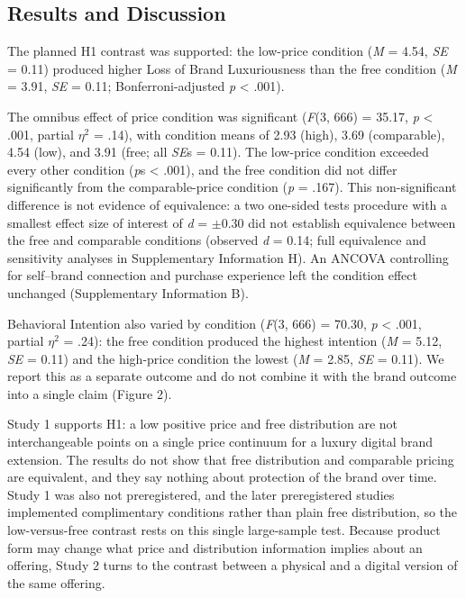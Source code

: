 \documentclass[12pt, a4paper]{article}
\begin{document}
\subsection{Results and Discussion}

The planned H1 contrast was supported: the low-price condition (\emph{M} = 4.54, \emph{SE} = 0.11) produced higher Loss of Brand Luxuriousness than the free condition (\emph{M} = 3.91, \emph{SE} = 0.11; Bonferroni-adjusted \emph{p} \textless{} .001).

The omnibus effect of price condition was significant (\emph{F}(3, 666) = 35.17, \emph{p} \textless{} .001, partial $\eta^2$ = .14), with condition means of 2.93 (high), 3.69 (comparable), 4.54 (low), and 3.91 (free; all \emph{SE}s = 0.11). The low-price condition exceeded every other condition (\emph{p}s \textless{} .001), and the free condition did not differ significantly from the comparable-price condition (\emph{p} = .167). This non-significant difference is not evidence of equivalence: a two one-sided tests procedure with a smallest effect size of interest of \emph{d} = $\pm$0.30 did not establish equivalence between the free and comparable conditions (observed \emph{d} = 0.14; full equivalence and sensitivity analyses in Supplementary Information H). An ANCOVA controlling for self--brand connection and purchase experience left the condition effect unchanged (Supplementary Information B).

Behavioral Intention also varied by condition (\emph{F}(3, 666) = 70.30, \emph{p} \textless{} .001, partial $\eta^2$ = .24): the free condition produced the highest intention (\emph{M} = 5.12, \emph{SE} = 0.11) and the high-price condition the lowest (\emph{M} = 2.85, \emph{SE} = 0.11). We report this as a separate outcome and do not combine it with the brand outcome into a single claim (Figure 2).

Study 1 supports H1: a low positive price and free distribution are not interchangeable points on a single price continuum for a luxury digital brand extension. The results do not show that free distribution and comparable pricing are equivalent, and they say nothing about protection of the brand over time. Study 1 was also not preregistered, and the later preregistered studies implemented complimentary conditions rather than plain free distribution, so the low-versus-free contrast rests on this single large-sample test. Because product form may change what price and distribution information implies about an offering, Study 2 turns to the contrast between a physical and a digital version of the same offering.
\end{document}
